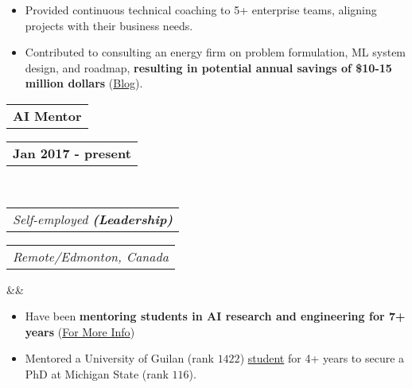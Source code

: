 \documentclass[11pt,a4paper,roman,colorlinks,linkcolor=blue,filecolor=magenta,urlcolor=cyan]{moderncv}        %
\makeatletter
\newcommand*{\customcventry}[7][.25em]{
  \begin{tabular}{@{}l} 
    {\bfseries #4}
  \end{tabular}
  \hfill%
  \begin{tabular}{l@{}}
     {\bfseries #5}
  \end{tabular} \\
  \begin{tabular}{@{}l} 
    {\itshape #3}
  \end{tabular}
  \hfill%
  \begin{tabular}{l@{}}
     {\itshape #2}
  \end{tabular}
  \ifx&#7&%
  \else{\\%
    \begin{minipage}{\maincolumnwidth}%
      \small#7%
    \end{minipage}}\fi%
  \par\addvspace{#1}}
\makeatother
\begin{document}
    
\begin{itemize}
    \item Provided continuous technical coaching to 5+ enterprise teams, aligning projects with their business needs.
    \item Contributed to consulting an energy firm on problem formulation, ML system design, and roadmap, \textbf{resulting in potential annual savings of \$10-15 million dollars} (\href{https://www.amii.ca/latest-from-amii/venturi-uses-machine-learning-reduce-emissions-increase-safety-pipelines/}{Blog}).
\end{itemize}
\customcventry{Remote/Edmonton, Canada}{Self-employed \textbf{(Leadership)}}{AI Mentor}{Jan 2017 - present}{}{}
\begin{itemize}
    \item Have been \textbf{mentoring students in AI research and engineering for 7+ years}  (\href{https://erfanmhi.github.io/pages/mentorship.html}{For More Info})
    \item Mentored a University of Guilan (rank $1422$) \href{https://scholar.google.com/citations?user=DadaCmsAAAAJ&hl=en}{student} for 4+ years to secure a PhD at Michigan State (rank $116$).


    \end{itemize}
    
\end{document}
